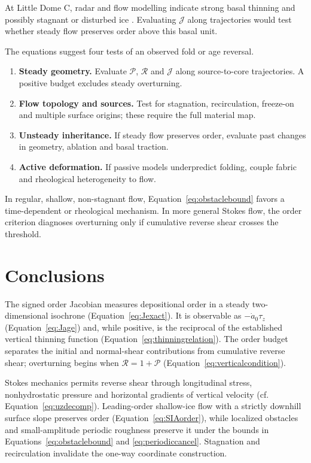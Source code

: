 \documentclass[review]{igs}
\begin{document}
At Little Dome C, radar and flow modelling indicate strong basal thinning and possibly stagnant or disturbed ice \citep{Lilien2021,Chung2025BeyondEPICA}. Evaluating \(\mathcal{J}\) along trajectories would test whether steady flow preserves order above this basal unit.

The equations suggest four tests of an observed fold or age reversal.

\begin{enumerate}[leftmargin=*,label=(\arabic*)]
  \item \textbf{Steady geometry.} Evaluate \(\mathcal{P}\), \(\mathcal{R}\) and \(\mathcal{J}\) along source-to-core trajectories. A positive budget excludes steady overturning.
  \item \textbf{Flow topology and sources.} Test for stagnation, recirculation, freeze-on and multiple surface origins; these require the full material map.
  \item \textbf{Unsteady inheritance.} If steady flow preserves order, evaluate past changes in geometry, ablation and basal traction.
  \item \textbf{Active deformation.} If passive models underpredict folding, couple fabric and rheological heterogeneity to flow.
\end{enumerate}

In regular, shallow, non-stagnant flow, Equation~\ref{eq:obstaclebound} favors a time-dependent or rheological mechanism. In more general Stokes flow, the order criterion diagnoses overturning only if cumulative reverse shear crosses the threshold.

\section{Conclusions}

The signed order Jacobian measures depositional order in a steady two-dimensional isochrone (Equation~\ref{eq:Jexact}). It is observable as \(-\dot a_0\tau_z\) (Equation~\ref{eq:Jage}) and, while positive, is the reciprocal of the established vertical thinning function (Equation~\ref{eq:thinningrelation}). The order budget separates the initial and normal-shear contributions from cumulative reverse shear; overturning begins when \(\mathcal{R}=1+\mathcal{P}\) (Equation~\ref{eq:verticalcondition}).

Stokes mechanics permits reverse shear through longitudinal stress, nonhydrostatic pressure and horizontal gradients of vertical velocity (cf. Equation~\ref{eq:uzdecomp}). Leading-order shallow-ice flow with a strictly downhill surface slope preserves order (Equation~\ref{eq:SIAorder}), while localized obstacles and small-amplitude periodic roughness preserve it under the bounds in Equations~\ref{eq:obstaclebound} and \ref{eq:periodiccancel}. Stagnation and recirculation invalidate the one-way coordinate construction.
\end{document}
